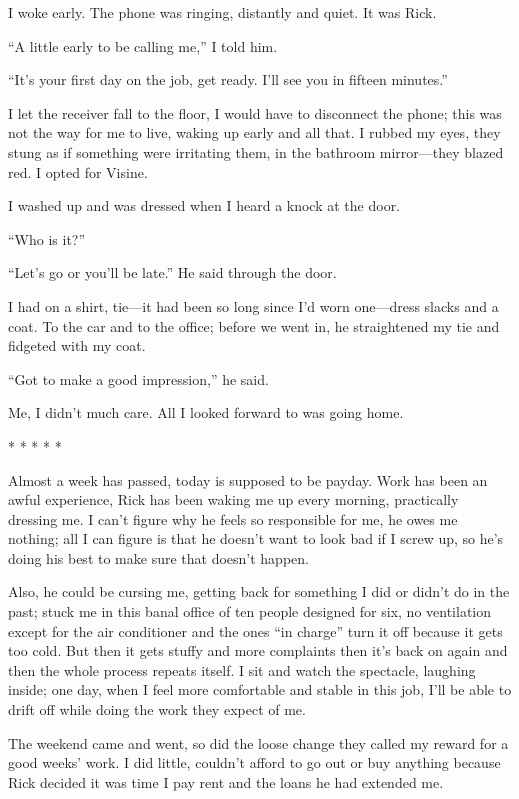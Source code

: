 \documentclass[
]{article}
\begin{document}
I woke early. The phone was ringing, distantly and quiet. It was Rick.

``A little early to be calling me,'' I told him.

``It's your first day on the job, get ready. I'll see you in fifteen
minutes.''

I let the receiver fall to the floor, I would have to disconnect the
phone; this was not the way for me to live, waking up early and all
that. I rubbed my eyes, they stung as if something were irritating them,
in the bathroom mirror---they blazed red. I opted for Visine.

I washed up and was dressed when I heard a knock at the door.

``Who is it?''

``Let's go or you'll be late.'' He said through the door.

I had on a shirt, tie---it had been so long since I'd worn one---dress
slacks and a coat. To the car and to the office; before we went in, he
straightened my tie and fidgeted with my coat.

``Got to make a good impression,'' he said.

Me, I didn't much care. All I looked forward to was going home.

* * * * *

Almost a week has passed, today is supposed to be payday. Work has been
an awful experience, Rick has been waking me up every morning,
practically dressing me. I can't figure why he feels so responsible for
me, he owes me nothing; all I can figure is that he doesn't want to look
bad if I screw up, so he's doing his best to make sure that doesn't
happen.

Also, he could be cursing me, getting back for something I did or didn't
do in the past; stuck me in this banal office of ten people designed for
six, no ventilation except for the air conditioner and the ones ``in
charge'' turn it off because it gets too cold. But then it gets stuffy
and more complaints then it's back on again and then the whole process
repeats itself. I sit and watch the spectacle, laughing inside; one day,
when I feel more comfortable and stable in this job, I'll be able to
drift off while doing the work they expect of me.

The weekend came and went, so did the loose change they called my reward
for a good weeks' work. I did little, couldn't afford to go out or buy
anything because Rick decided it was time I pay rent and the loans he
had extended me.
\end{document}
